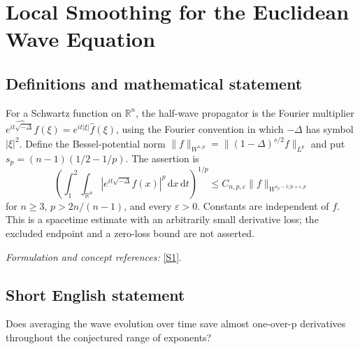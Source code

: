 \documentclass[11pt]{article}
\newcommand{\R}{\mathbb{R}}
\newcommand{\eps}{\varepsilon}
\newcommand{\dd}{\,\mathrm d}
\newcommand{\sref}[2]{\hyperlink{source:#1:#2}{[S#2]}}
\newif\ifshowcatalogue
\newcommand{\cataloguescope}[1]{\ifshowcatalogue
	\paragraph{Exact scope in the supplied catalogue.}
	\begin{quote}\small #1\end{quote}\fi}
\begin{document}
\setcounter{section}{0}
	\clearpage
\section*{\texorpdfstring{Local Smoothing for the Euclidean Wave Equation}{Local Smoothing for the Euclidean Wave Equation}}\label{30004844}
\subsection{Definitions and mathematical statement}
For a Schwartz function on $\R^n$, the half-wave propagator is the Fourier multiplier
	$\widehat{e^{it\sqrt{-\Delta}}f}(\xi)=e^{it|\xi|}\widehat f(\xi)$, using the Fourier convention in which $-\Delta$ has symbol $|\xi|^2$. Define the Bessel-potential norm
	$\|f\|_{W^{s,p}}=\|(1-\Delta)^{s/2}f\|_{L^p}$ and put $s_p=(n-1)(1/2-1/p)$. The assertion is
	\[
	\left(\int_1^2\int_{\R^n}|e^{it\sqrt{-\Delta}}f(x)|^p\dd x\dd t\right)^{1/p}
	\le C_{n,p,\eps}\|f\|_{W^{s_p-1/p+\eps,p}}
	\]
	for $n\ge3$, $p>2n/(n-1)$, and every $\eps>0$. Constants are independent of $f$. This is a spacetime estimate with an arbitrarily small derivative loss; the excluded endpoint and a zero-loss bound are not asserted.
	\par\smallskip\textit{Formulation and concept references:} \sref{30004844}{1}.
	\cataloguescope{For every n >= 3, p > 2n/(n-1), and epsilon > 0, prove ||exp(it sqrt(-Delta))f||\_\{L\textasciicircum{}p(R\textasciicircum{}n x [1,2])\} <= C\_\{p,epsilon\} ||f||\_\{W\textasciicircum{}\{s\_p-1/p+epsilon,p\}(R\textasciicircum{}n)\}, where s\_p=(n-1)(1/2-1/p).}

\subsection{Short English statement}
Does averaging the wave evolution over time save almost one-over-p derivatives throughout the conjectured range of exponents?
\end{document}

